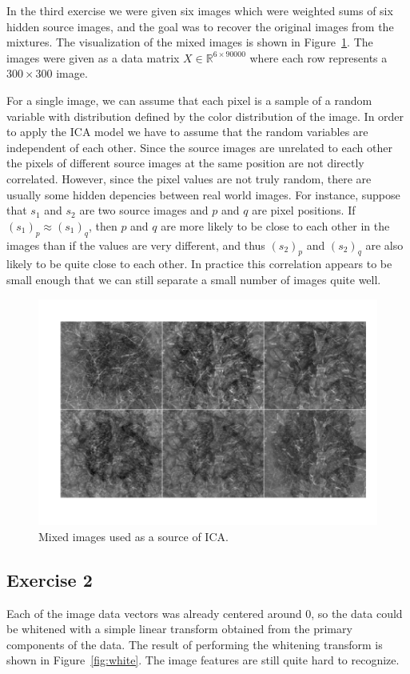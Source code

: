 \documentclass{article}
\begin{document}
In the third exercise we were given six images which were weighted sums of six hidden source images, and the goal was to recover the original images from the mixtures.
The visualization of the mixed images is shown in Figure~\ref{fig:mixed}. The images were given as a data matrix $X\in\mathbb{R}^{6\times 90000}$ where each row represents a $300\times 300$ image.

For a single image, we can assume that each pixel is a sample of a random variable with distribution defined by the color distribution of the image.
In order to apply the ICA model we have to assume that the random variables are independent of each other.
Since the source images are unrelated to each other the pixels of different source images at the same position are not directly correlated.
However, since the pixel values are not truly random, there are usually some hidden depencies between real world images.
For instance, suppose that $s_1$ and $s_2$ are two source images and $p$ and $q$ are pixel positions.
If $(s_1)_p\approx(s_1)_q$, then $p$ and $q$ are more likely to be close to each other in the images than if the values are very different, and thus $(s_2)_p$ and $(s_2)_q$ are also likely to be quite close to each other.
In practice this correlation appears to be small enough that we can still separate a small number of images quite well.

\newcommand\iscale{0.45}
\begin{figure}\centering
	\includegraphics[scale=\iscale]{mixed}
	\caption{Mixed images used as a source of ICA.}\label{fig:mixed}
\end{figure}

\subsection{Exercise 2}
Each of the image data vectors was already centered around 0, so the data could be whitened with a simple linear transform obtained from the primary components of the data.
The result of performing the whitening transform is shown in Figure~\ref{fig:white}.
The image features are still quite hard to recognize.
\end{document}
